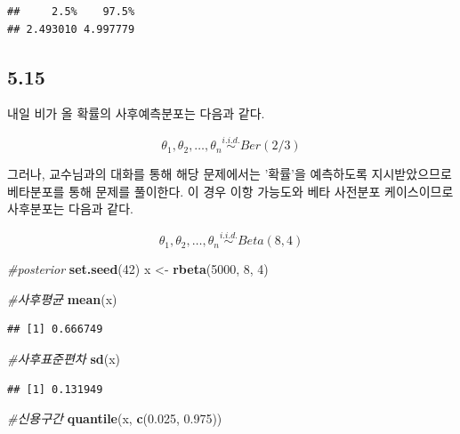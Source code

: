 \documentclass[
]{article}
\newenvironment{Shaded}{\begin{snugshade}}{\end{snugshade}}
\newcommand{\CommentTok}[1]{\textcolor[rgb]{0.56,0.35,0.01}{\textit{#1}}}
\newcommand{\DecValTok}[1]{\textcolor[rgb]{0.00,0.00,0.81}{#1}}
\newcommand{\FloatTok}[1]{\textcolor[rgb]{0.00,0.00,0.81}{#1}}
\newcommand{\FunctionTok}[1]{\textcolor[rgb]{0.13,0.29,0.53}{\textbf{#1}}}
\newcommand{\NormalTok}[1]{#1}
\newcommand{\OtherTok}[1]{\textcolor[rgb]{0.56,0.35,0.01}{#1}}
\begin{document}
\begin{verbatim}
##     2.5%    97.5% 
## 2.493010 4.997779
\end{verbatim}

\subsection{5.15}\label{section-3}

내일 비가 올 확률의 사후예측분포는 다음과 같다.

\[{\theta}_1, {\theta}_2, \ldots, {\theta}_n \stackrel{i.i.d.}{\sim} Ber(2/3)\]

그러나, 교수님과의 대화를 통해 해당 문제에서는 '확률'을 예측하도록
지시받았으므로 베타분포를 통해 문제를 풀이한다. 이 경우 이항 가능도와
베타 사전분포 케이스이므로 사후분포는 다음과 같다.

\[{\theta}_1, {\theta}_2, \ldots, {\theta}_n \stackrel{i.i.d.}{\sim} Beta(8, 4)\]

\begin{Shaded}
\begin{Highlighting}[]
\CommentTok{\#posterior}
\FunctionTok{set.seed}\NormalTok{(}\DecValTok{42}\NormalTok{)}
\NormalTok{x }\OtherTok{\textless{}{-}} \FunctionTok{rbeta}\NormalTok{(}\DecValTok{5000}\NormalTok{, }\DecValTok{8}\NormalTok{, }\DecValTok{4}\NormalTok{)}

\CommentTok{\#사후평균}
\FunctionTok{mean}\NormalTok{(x)}
\end{Highlighting}
\end{Shaded}

\begin{verbatim}
## [1] 0.666749
\end{verbatim}

\begin{Shaded}
\begin{Highlighting}[]
\CommentTok{\#사후표준편차}
\FunctionTok{sd}\NormalTok{(x)}
\end{Highlighting}
\end{Shaded}

\begin{verbatim}
## [1] 0.131949
\end{verbatim}

\begin{Shaded}
\begin{Highlighting}[]
\CommentTok{\#신용구간}
\FunctionTok{quantile}\NormalTok{(x, }\FunctionTok{c}\NormalTok{(}\FloatTok{0.025}\NormalTok{, }\FloatTok{0.975}\NormalTok{))}
\end{Highlighting}
\end{Shaded}
\end{document}
